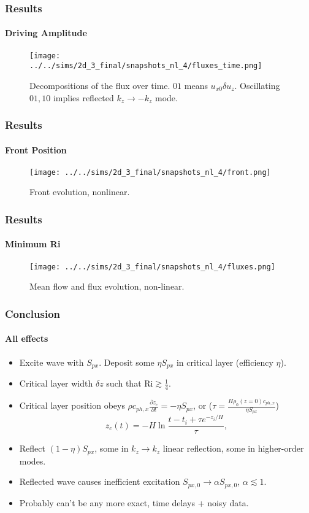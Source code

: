\documentclass[dvipsnames]{beamer}
\newcommand*{\pd}[2]{\frac{\partial#1}{\partial#2}}
\begin{document}
\begin{frame}
    \frametitle{Results}
    \framesubtitle{Driving Amplitude}

    \begin{figure}[t]
        \centering
        \texttt{[image: ../../sims/2d\_3\_final/snapshots\_nl\_4/fluxes\_time.png]}
        \caption{Decompositions of the flux over time. $01$ means $u_{x0} \delta
        u_z$. Oscillating $01, 10$ implies reflected $k_z \to -k_z$ mode.}
    \end{figure}
\end{frame}

\begin{frame}
    \frametitle{Results}
    \framesubtitle{Front Position}

    \begin{figure}[t]
        \centering
        \texttt{[image: ../../sims/2d\_3\_final/snapshots\_nl\_4/front.png]}
        \caption{Front evolution, nonlinear.}
    \end{figure}
\end{frame}

\begin{frame}
    \frametitle{Results}
    \framesubtitle{Minimum Ri}

    \begin{figure}[t]
        \centering
        \texttt{[image: ../../sims/2d\_3\_final/snapshots\_nl\_4/fluxes.png]}
        \caption{Mean flow and flux evolution, non-linear.}
    \end{figure}
\end{frame}

\begin{frame}
    \frametitle{Conclusion}
    \framesubtitle{All effects}

    \begin{itemize}
        \item Excite wave with $S_{px}$. Deposit some $\eta S_{px}$ in
            critical layer (efficiency $\eta$).

        \item Critical layer width $\delta z$ such that $\mathrm{Ri} \gtrsim
            \frac{1}{4}$.

        \item Critical layer position obeys $\rho c_{ph, x} \pd{z_c}{t}
            = -\eta S_{px}$, or ($\tau = \frac{H\rho_0(z = 0)c_{ph,x}}
            {\eta S_{px}}$)
            \begin{equation}
                z_c(t) = -H\ln \frac{t - t_i + \tau e^{-z_i/H}}{\tau},
            \end{equation}

        \item Reflect $(1 - \eta)S_{px}$, some in $k_z \to k_z$ linear
            reflection, some in higher-order modes.

        \item Reflected wave causes inefficient excitation $S_{px,0} \to \alpha
            S_{px, 0}$, $\alpha \lesssim 1$.

        \item Probably can't be any more exact, time delays + noisy data.
    \end{itemize}
\end{frame}
\end{document}
